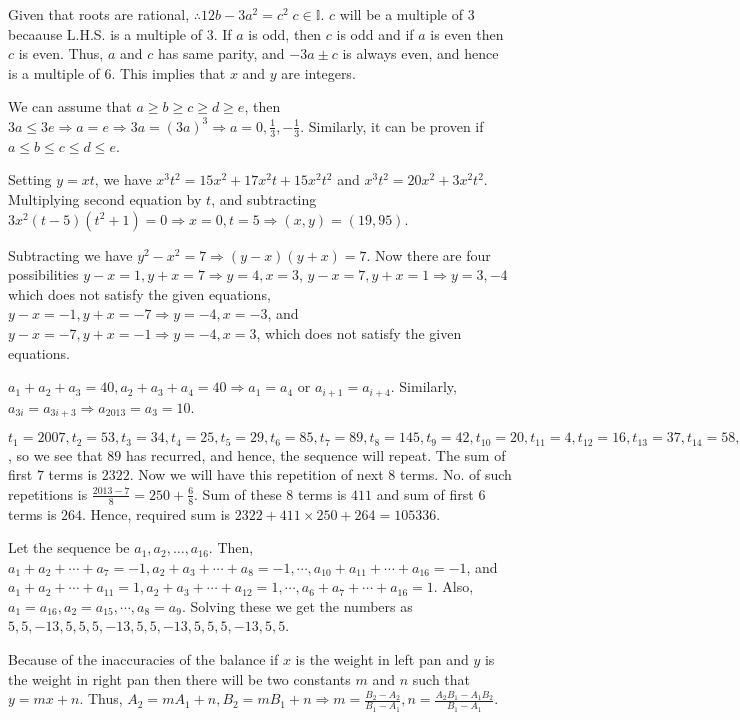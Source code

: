   Given that roots are rational, $\therefore 12b - 3a^2 = c^2\;c\in\mathbb{I}$. $c$ will be a multiple of
  $3$ becaause L.H.S. is a multiple of $3$. If $a$ is odd, then $c$ is odd and if $a$ is even then $c$ is
  even. Thus, $a$ and $c$ has same parity, and $-3a\pm c$ is always even, and hence is a multiple of
  $6$. This implies that $x$ and $y$ are integers.
\item We can assume that $a\geq b\geq c\geq d\geq e$, then $3a\leq3e \Rightarrow a = e\Rightarrow 3a =
  (3a)^3 \Rightarrow a = 0, \frac{1}{3}, -\frac{1}{3}$. Similarly, it can be proven if $a\leq b\leq c\leq
  d\leq e$.
\item Setting $y = xt$, we have $x^3t^2 = 15x^2 + 17x^2t + 15x^2t^2$ and $x^3t^2 = 20x^2 +
  3x^2t^2$. Multiplying second equation by $t$, and subtracting $3x^2(t - 5)(t^2 + 1) = 0 \Rightarrow x = 0,
  t = 5\Rightarrow (x, y) = (19, 95)$.
\item Subtracting we have $y^2 - x^2 = 7 \Rightarrow (y - x)(y + x) = 7$. Now there are four possibilities
  $y - x = 1, y + x = 7\Rightarrow y = 4, x = 3$, $y - x = 7, y + x = 1\Rightarrow y = 3, -4$ which
  does not satisfy the given equations, $y - x = -1, y + x = -7\Rightarrow y = -4, x = -3$, and $y - x =
  -7, y + x = -1\Rightarrow y = -4, x = 3$, which does not satisfy the given equations.
\item $a_1 + a_2 + a_3 = 40, a_2 + a_3 + a_4 = 40\Rightarrow a_1 = a_4$ or $a_{i+ 1} = a_{i + 4}$. Similarly,
  $a_{3i} = a_{3i + 3}\Rightarrow a_{2013} = a_3 = 10$.
\item $t_1 = 2007, t_2 = 53, t_3 = 34, t_4 = 25, t_5 = 29, t_6 = 85, t_7 = 89, t_8 = 145, t_9 = 42, t_{10} =
  20, t_{11} = 4, t_{12} = 16, t_{13} = 37, t_{14} = 58, t_{15} = 89$, so we see that $89$ has recurred, and
  hence, the sequence will repeat. The sum of first $7$ terms is $2322$. Now we will have this repetition of
  next $8$ terms. No. of such repetitions is $\frac{2013 - 7}{8} = 250 + \frac{6}{8}$. Sum of these $8$
  terms is $411$ and sum of first $6$ terms is $264$. Hence, required sum is $2322 + 411\times250 + 264 =
  105336$.
\item Let the sequence be $a_1, a_2, \ldots, a_{16}$. Then, $a_1 + a_2 + \cdots + a_7 = -1, a_2 + a_3 +
  \cdots + a_8 = -1, \cdots, a_{10} + a_{11} + \cdots + a_{16} = -1$, and $a_1 + a_2 + \cdots + a_{11} = 1,
  a_2 + a_3 + \cdots + a_{12} = 1, \cdots, a_6 + a_7 + \cdots + a_{16} = 1$. Also, $a_1 = a_{16}, a_2 =
  a_{15}, \cdots, a_8 = a_9$. Solving these we get the numbers as $5, 5, -13, 5, 5, 5, -13, 5, 5, -13, 5, 5,
  5, -13, 5, 5$.
\item Because of the inaccuracies of the balance if $x$ is the weight in left pan and $y$ is the weight in
  right pan then there will be two constants $m$ and $n$ such that $y = mx + n$. Thus, $A_2 = mA_1 + n, B_2
  = mB_1 + n \Rightarrow m = \frac{B_2 - A_2}{B_1 - A_1}, n = \frac{A_2B_1 - A_1B_2}{B_1 - A_1}$.

